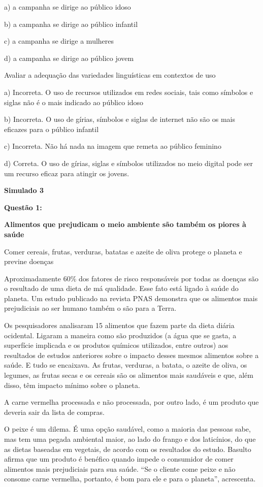 a) a campanha se dirige ao público idoso

b) a campanha se dirige ao público infantil

c) a campanha se dirige a mulheres

d) a campanha se dirige ao público jovem

Avaliar a adequação das variedades linguísticas em contextos de uso

a) Incorreta. O uso de recursos utilizados em redes sociais, tais como
símbolos e siglas não é o mais indicado ao público idoso

b) Incorreta. O uso de gírias, símbolos e siglas de internet não são os
mais eficazes para o público infantil

c) Incorreta. Não há nada na imagem que remeta ao público feminino

d) Correta. O uso de gírias, siglas e símbolos utilizados no meio
digital pode ser um recurso eficaz para atingir os jovens.

\textbf{Simulado 3}

\textbf{Questão 1:}

\textbf{Alimentos que prejudicam o meio ambiente são também os piores à
saúde}

Comer cereais, frutas, verduras, batatas e azeite de oliva protege o
planeta e previne doenças

Aproximadamente 60\% dos fatores de risco responsáveis por todas as
doenças são o resultado de uma dieta de má qualidade. Esse fato está
ligado à saúde do planeta. Um estudo publicado na revista PNAS demonstra
que os alimentos mais prejudiciais ao ser humano também o são para a
Terra.

Os pesquisadores analisaram 15 alimentos que fazem parte da dieta diária
ocidental. Ligaram a maneira como são produzidos (a água que se gasta, a
superfície implicada e os produtos químicos utilizados, entre outros)
aos resultados de estudos anteriores sobre o impacto desses mesmos
alimentos sobre a saúde. E tudo se encaixava. As frutas, verduras, a
batata, o azeite de oliva, os legumes, as frutas secas e os cereais são
os alimentos mais saudáveis e que, além disso, têm impacto mínimo sobre
o planeta.

A carne vermelha processada e não processada, por outro lado, é um
produto que deveria sair da lista de compras.

O peixe é um dilema. É uma opção saudável, como a maioria das pessoas
sabe, mas tem uma pegada ambiental maior, ao lado do frango e dos
laticínios, do que as dietas baseadas em vegetais, de acordo com os
resultados do estudo. Basulto afirma que um produto é benéfico quando
impede o consumidor de comer alimentos mais prejudiciais para sua saúde.
``Se o cliente come peixe e não consome carne vermelha, portanto, é bom
para ele e para o planeta'', acrescenta.

